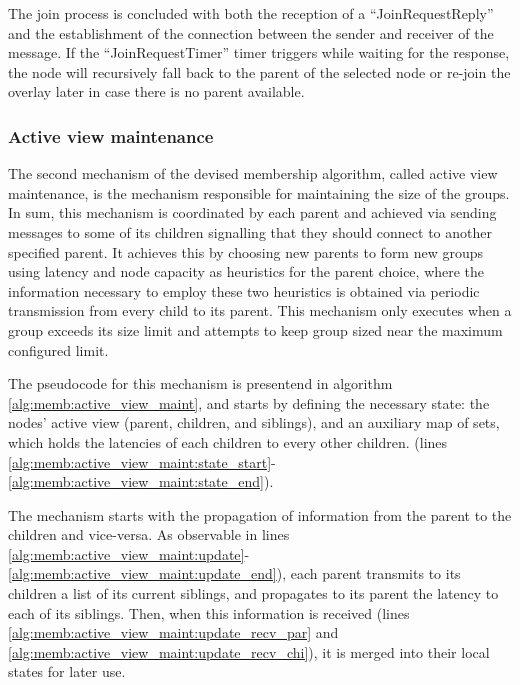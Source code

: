 The join process is concluded with both the reception of a ``JoinRequestReply'' and the establishment of the connection between the sender and receiver of the message. If the ``JoinRequestTimer'' timer triggers while waiting for the response, the node will recursively fall back to the parent of the selected node or re-join the overlay later in case there is no parent available. 

\subsubsection{Active view maintenance} \label{sec:overlay_network:active_view_maint}

The second mechanism of the devised membership algorithm, called active view maintenance, is the mechanism responsible for maintaining the size of the groups. In sum, this mechanism is coordinated by each parent and achieved via sending messages to some of its children signalling that they should connect to another specified parent. It achieves this by choosing new parents to form new groups using latency and node capacity as heuristics for the parent choice, where the information necessary to employ these two heuristics is obtained via periodic transmission from every child to its parent. This mechanism only executes when a group exceeds its size limit and attempts to keep group sized near the maximum configured limit.

The pseudocode for this mechanism is presentend in algorithm \ref{alg:memb:active_view_maint}, and starts by defining the necessary state: the nodes' active view (parent, children, and siblings), and an auxiliary map of sets, which holds the latencies of each children to every other children. (lines \ref{alg:memb:active_view_maint:state_start}-\ref{alg:memb:active_view_maint:state_end}). 



The mechanism starts with the propagation of information from the parent to the children and vice-versa. As observable in lines \ref{alg:memb:active_view_maint:update}-\ref{alg:memb:active_view_maint:update_end}), each parent transmits to its children a list of its current siblings, and propagates to its parent the latency to each of its siblings. Then, when this information is received (lines \ref{alg:memb:active_view_maint:update_recv_par} and \ref{alg:memb:active_view_maint:update_recv_chi}), it is merged into their local states for later use.

